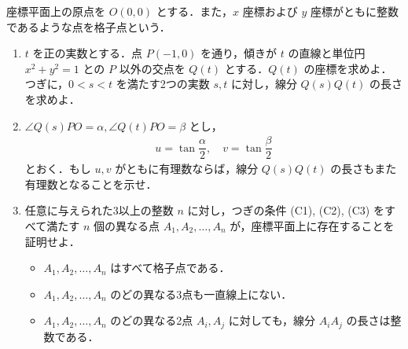 \documentclass[../../main.tex]{subfiles}
\begin{document}
座標平面上の原点を $O(0,0)$ とする．また，$x$ 座標および $y$ 座標がともに整数であるような点を格子点という．

\begin{enumerate}
  \item $t$ を正の実数とする．点 $P(-1, 0)$ を通り，傾きが $t$ の直線と単位円 $x^2 + y^2 = 1$ との $P$ 以外の交点を $Q(t)$ とする．$Q(t)$ の座標を求めよ．つぎに，$0 < s < t$ を満たす2つの実数 $s, t$ に対し，線分 $Q(s)Q(t)$ の長さを求めよ．
  \item $\angle Q(s)PO = \alpha, \angle Q(t)PO = \beta$ とし，
    \begin{align}
      u = \tan \dfrac{\alpha}{2}, \quad v = \tan \dfrac{\beta}{2}
    \end{align}
    とおく．もし $u, v$ がともに有理数ならば，線分 $Q(s)Q(t)$ の長さもまた有理数となることを示せ．
  \item 任意に与えられた3以上の整数 $n$ に対し，つぎの条件 (C1), (C2), (C3) をすべて満たす $n$ 個の異なる点 $A_1, A_2, \dots, A_n$ が，座標平面上に存在することを証明せよ．
    \begin{itemize}
      \item[(C1)] $A_1, A_2, \dots, A_n$ はすべて格子点である．
      \item[(C2)] $A_1, A_2, \dots, A_n$ のどの異なる3点も一直線上にない．
      \item[(C3)] $A_1, A_2, \dots, A_n$ のどの異なる2点 $A_i, A_j$ に対しても，線分 $A_iA_j$ の長さは整数である．
    \end{itemize}
\end{enumerate}
\end{document}

